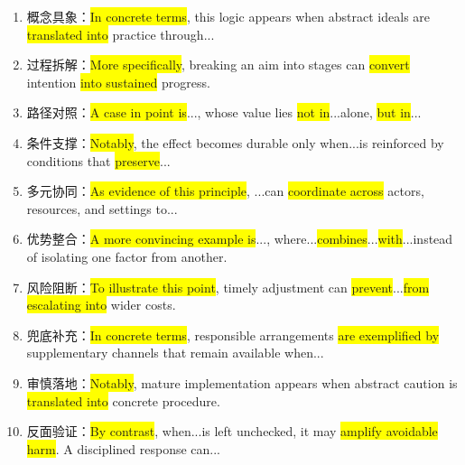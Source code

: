 ﻿\documentclass[lang=cn,11pt]{elegantbook}
\begin{document}
\begin{enumerate}
    \item 概念具象：\colorbox{yellow}{In concrete terms}, this logic appears when abstract ideals are \colorbox{yellow}{translated into} practice through...

    \item 过程拆解：\colorbox{yellow}{More specifically}, breaking an aim into stages can \colorbox{yellow}{convert} intention \colorbox{yellow}{into sustained} progress.

    \item 路径对照：\colorbox{yellow}{A case in point is}..., whose value lies \colorbox{yellow}{not in}...alone, \colorbox{yellow}{but in}...

    \item 条件支撑：\colorbox{yellow}{Notably}, the effect becomes durable only when...is reinforced by conditions that \colorbox{yellow}{preserve}...

    \item 多元协同：\colorbox{yellow}{As evidence of this principle}, ...can \colorbox{yellow}{coordinate across} actors, resources, and settings to...

    \item 优势整合：\colorbox{yellow}{A more convincing example is}..., where...\colorbox{yellow}{combines}...\colorbox{yellow}{with}...instead of isolating one factor from another.

    \item 风险阻断：\colorbox{yellow}{To illustrate this point}, timely adjustment can \colorbox{yellow}{prevent}...\colorbox{yellow}{from escalating into} wider costs.

    \item 兜底补充：\colorbox{yellow}{In concrete terms}, responsible arrangements \colorbox{yellow}{are exemplified by} supplementary channels that remain available when...

    \item 审慎落地：\colorbox{yellow}{Notably}, mature implementation appears when abstract caution is \colorbox{yellow}{translated into} concrete procedure.

    \item 反面验证：\colorbox{yellow}{By contrast}, when...is left unchecked, it may \colorbox{yellow}{amplify avoidable harm}. A disciplined response can...
\end{enumerate}
\end{document}
